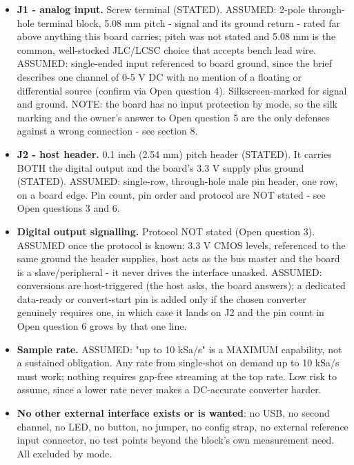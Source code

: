 \documentclass[11pt,a4paper]{article}
\begin{document}
\begin{itemize}
\item \textbf{J1 - analog input.} Screw terminal (STATED). ASSUMED: 2-pole through-hole
terminal block, 5.08 mm pitch - signal and its ground return - rated far
above anything this board carries; pitch was not stated and 5.08 mm is the
common, well-stocked JLC/LCSC choice that accepts bench lead wire. ASSUMED:
single-ended input referenced to board ground, since the brief describes one
channel of 0-5 V DC with no mention of a floating or differential source
(confirm via Open question 4). Silkscreen-marked for signal and ground.
NOTE: the board has no input protection by mode, so the silk marking and the
owner's answer to Open question 5 are the only defenses against a wrong
connection - see section 8.
\item \textbf{J2 - host header.} 0.1 inch (2.54 mm) pitch header (STATED). It carries
BOTH the digital output and the board's 3.3 V supply plus ground (STATED).
ASSUMED: single-row, through-hole male pin header, one row, on a board edge.
Pin count, pin order and protocol are NOT stated - see Open questions 3
and 6.
\item \textbf{Digital output signalling.} Protocol NOT stated (Open question 3).
ASSUMED once the protocol is known: 3.3 V CMOS levels, referenced to the
same ground the header supplies, host acts as the bus master and the board
is a slave/peripheral - it never drives the interface unasked. ASSUMED:
conversions are host-triggered (the host asks, the board answers); a
dedicated data-ready or convert-start pin is added only if the chosen
converter genuinely requires one, in which case it lands on J2 and the pin
count in Open question 6 grows by that one line.
\item \textbf{Sample rate.} ASSUMED: "up to 10 kSa/s" is a MAXIMUM capability, not a
sustained obligation. Any rate from single-shot on demand up to 10 kSa/s
must work; nothing requires gap-free streaming at the top rate. Low risk to
assume, since a lower rate never makes a DC-accurate converter harder.
\item \textbf{No other external interface exists or is wanted}: no USB, no second
channel, no LED, no button, no jumper, no config strap, no external
reference input connector, no test points beyond the block's own measurement
need. All excluded by mode.
\end{itemize}
\end{document}
